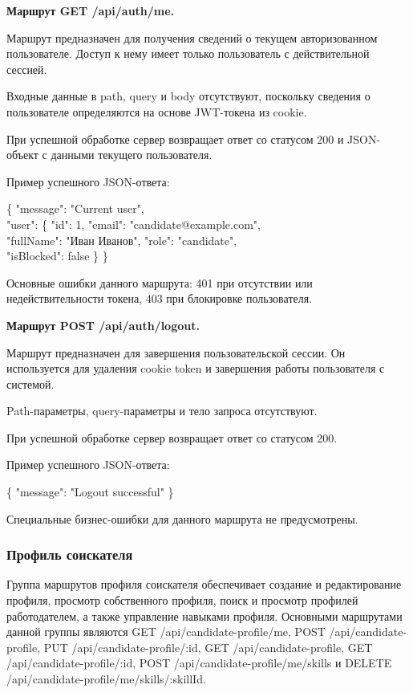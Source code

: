 \textbf{Маршрут GET /api/auth/me.}

Маршрут предназначен для получения сведений о текущем авторизованном пользователе. Доступ к нему имеет только пользователь с действительной сессией.

Входные данные в path, query и body отсутствуют, поскольку сведения о пользователе определяются на основе JWT-токена из cookie.

При успешной обработке сервер возвращает ответ со статусом 200 и JSON-объект с данными текущего пользователя.

Пример успешного JSON-ответа:

\begin{flushleft}
	\small\ttfamily
	\{ "message": "Current user",\\
	"user": \{ "id": 1, "email": "candidate@example.com",\\
	"fullName": "Иван Иванов", "role": "candidate",\\
	"isBlocked": false \} \}
\end{flushleft}

Основные ошибки данного маршрута: 401 при отсутствии или недействительности токена, 403 при блокировке пользователя.

\textbf{Маршрут POST /api/auth/logout.}

Маршрут предназначен для завершения пользовательской сессии. Он используется для удаления cookie token и завершения работы пользователя с системой.

Path-параметры, query-параметры и тело запроса отсутствуют.

При успешной обработке сервер возвращает ответ со статусом 200.

Пример успешного JSON-ответа:

\begin{flushleft}
	\small\ttfamily
	\{ "message": "Logout successful" \}
\end{flushleft}

Специальные бизнес-ошибки для данного маршрута не предусмотрены.

\subsubsection{Профиль соискателя}

Группа маршрутов профиля соискателя обеспечивает создание и редактирование профиля, просмотр собственного профиля, поиск и просмотр профилей работодателем, а также управление навыками профиля. Основными маршрутами данной группы являются GET /api/candidate-profile/me, POST /api/candidate-profile, PUT /api/candidate-profile/:id, GET /api/candidate-profile, GET /api/candidate-profile/:id, POST /api/candidate-profile/me/skills и DELETE /api/candidate-profile/me/skills/:skillId.

